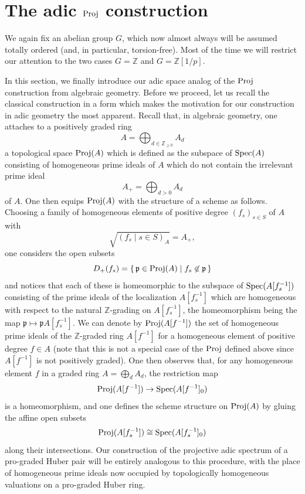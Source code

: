 \documentclass[12pt,twoside,a4paper]{article}
\theoremstyle{definition}
\theoremstyle{remark}
\newcommand\Proj{{\rm Proj}}
\newcommand\Spec{{\rm Spec}}
\begin{document}
\section{The adic $\Proj$ construction}\label{sec:adic Proj}

We again fix an abelian group $G$, which now almost always will be assumed totally ordered (and, in particular, torsion-free). Most of the time we will restrict our attention to the two cases $G=\mathbb{Z}$ and $G=\mathbb{Z}[1/p]$. 

In this section, we finally introduce our adic space analog of the $\Proj$ construction from algebraic geometry. Before we proceed, let us recall the classical construction in a form which makes the motivation for our construction in adic geometry the most apparent. Recall that, in algebraic geometry, one attaches to a positively graded ring \begin{equation*}A=\bigoplus_{d\in\mathbb{Z}_{\geq0}}A_{d}\end{equation*}a topological space $\Proj(A)$ which is defined as the subspace of $\Spec(A)$ consisting of homogeneous prime ideals of $A$ which do not contain the irrelevant prime ideal \begin{equation*}A_{+}=\bigoplus_{d>0}A_{d}\end{equation*}of $A$. One then equips $\Proj(A)$ with the structure of a scheme as follows. Choosing a family of homogeneous elements of positive degree $(f_{s})_{s\in S}$ of $A$ with \begin{equation*}\sqrt{(f_{s}\mid s\in S)_{A}}=A_{+},\end{equation*}one considers the open subsets \begin{equation*}D_{+}(f_{s})=\{\, \mathfrak{p}\in \Proj(A)\mid f_{s}\not\in\mathfrak{p}\,\}\end{equation*}and notices that each of these is homeomorphic to the subspace of $\Spec(A[f_{s}^{-1}])$ consisting of the prime ideals of the localization $A[f_{s}^{-1}]$ which are homogeneous with respect to the natural $\mathbb{Z}$-grading on $A[f_{s}^{-1}]$, the homeomorphism being the map $\mathfrak{p}\mapsto \mathfrak{p}A[f_{s}^{-1}]$. We can denote by $\Proj(A[f^{-1}])$ the set of homogeneous prime ideals of the $\mathbb{Z}$-graded ring $A[f^{-1}]$ for a homogeneous element of positive degree $f\in A$ (note that this is not a special case of the $\Proj$ defined above since $A[f^{-1}]$ is not positively graded). One then observes that, for any homogeneous element $f$ in a graded ring $A=\bigoplus_{d}A_{d}$, the restriction map \begin{equation*}\Proj(A[f^{-1}])\to \Spec(A[f^{-1}]_{0})\end{equation*}is a homeomorphism, and one defines the scheme structure on $\Proj(A)$ by gluing the affine open subsets \begin{equation*}\Proj(A[f_{s}^{-1}])\cong \Spec(A[f_{s}^{-1}]_{0})\end{equation*}along their intersections. Our construction of the projective adic spectrum of a pro-graded Huber pair will be entirely analogous to this procedure, with the place of homogeneous prime ideals now occupied by topologically homogeneous valuations on a pro-graded Huber ring.
\end{document}
